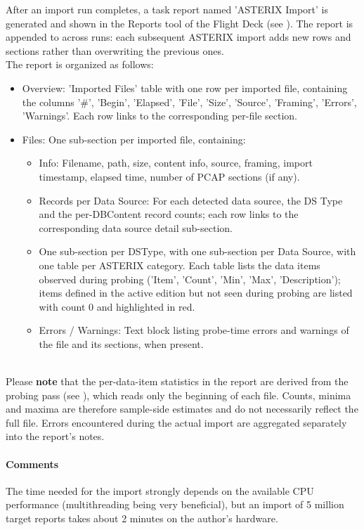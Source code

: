 After an import run completes, a task report named 'ASTERIX Import' is generated and shown in the Reports tool of the Flight Deck (see ). The report is appended to across runs: each subsequent ASTERIX import adds new rows and sections rather than overwriting the previous ones. \\

The report is organized as follows:

\begin{itemize}
\item Overview: 'Imported Files' table with one row per imported file, containing the columns '\#', 'Begin', 'Elapsed', 'File', 'Size', 'Source', 'Framing', 'Errors', 'Warnings'. Each row links to the corresponding per-file section.
\item Files: One sub-section per imported file, containing:
  \begin{itemize}
  \item Info: Filename, path, size, content info, source, framing, import timestamp, elapsed time, number of PCAP sections (if any).
  \item Records per Data Source: For each detected data source, the DS Type and the per-DBContent record counts; each row links to the corresponding data source detail sub-section.
  \item One sub-section per DSType, with one sub-section per Data Source, with one table per ASTERIX category. Each table lists the data items observed during probing ('Item', 'Count', 'Min', 'Max', 'Description'); items defined in the active edition but not seen during probing are listed with count 0 and highlighted in red.
  \item Errors / Warnings: Text block listing probe-time errors and warnings of the file and its sections, when present.
  \end{itemize}
\end{itemize}
\ \\

Please \textbf{note} that the per-data-item statistics in the report are derived from the probing pass (see ), which reads only the beginning of each file. Counts, minima and maxima are therefore sample-side estimates and do not necessarily reflect the full file. Errors encountered during the actual import are aggregated separately into the report's notes. \\

\paragraph{Comments}
The time needed for the import strongly depends on the available CPU performance (multithreading being very beneficial), but an import of 5 million target reports takes about 2 minutes on the author's hardware. \\

